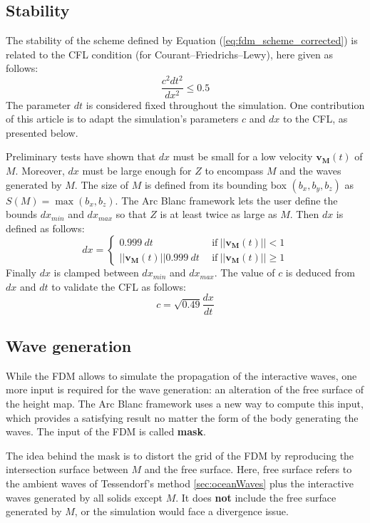 \documentclass[final]{jcgt}
\def\Framework{The Arc Blanc framework\xspace}
\begin{document}
\subsection{Stability}
\label{subsec:stability}
The stability of the scheme defined by Equation (\ref{eq:fdm_scheme_corrected}) is related to the CFL condition (for Courant–Friedrichs–Lewy), here given as follows:
\begin{equation}
	\frac{c^2dt^2}{dx^2}\leq 0.5
\end{equation}
The parameter $dt$ is considered fixed throughout the simulation.
One contribution of this article is to adapt the simulation's parameters $c$ and $dx$ to the CFL, as presented below.

Preliminary tests have shown that $dx$ must be small for a low velocity $\mathbf{v_M}(t)$ of $M$.
Moreover, $dx$ must be large enough for $Z$ to encompass $M$ and the waves generated by $M$.
The size of $M$ is defined from its bounding box $(b_x, b_y, b_z)$ as $S(M)=\max(b_x, b_z)$.
\Framework lets the user define the bounds $dx_{min}$ and $dx_{max}$ so that $Z$ is at least twice as large as $M$.
Then $dx$ is defined as follows:
\begin{equation}
	dx =
	\begin{cases}
		0.999~dt                    & ~~ \text{if}~||\mathbf{v_M}(t)||<1    \\
		||\mathbf{v_M}(t)||0.999~dt & ~~ \text{if}~||\mathbf{v_M}(t)||\geq1
	\end{cases}
\end{equation}
Finally $dx$ is clamped between $dx_{min}$ and $dx_{max}$.
The value of $c$ is deduced from $dx$ and $dt$ to validate the CFL as follows:
\begin{equation}
	c = \sqrt{0.49} \frac{dx}{dt}
\end{equation}

\subsection{Wave generation}
\label{subsec:mask}
While the FDM allows to simulate the propagation of the interactive waves, one more input is required for the wave generation: an alteration of the free surface of the height map.
\Framework uses a new way to compute this input, which provides a satisfying result no matter the form of the body generating the waves.
The input of the FDM is called \textbf{mask}.

The idea behind the mask is to distort the grid of the FDM by reproducing the intersection surface between $M$ and the free surface.
Here, free surface refers to the ambient waves of Tessendorf's method \ref{sec:oceanWaves} plus the interactive waves generated by all solids except $M$.
It does \textbf{not} include the free surface generated by $M$, or the simulation would face a divergence issue.
\end{document}
